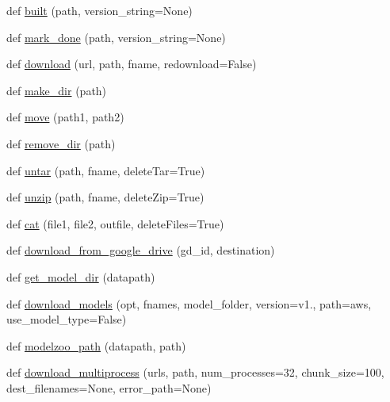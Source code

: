 \begin{DoxyCompactItemize}
\item 
def \hyperlink{namespaceparlai_1_1core_1_1build__data_ad834e1a9be02e18a6c2de2b03b9a8f10}{built} (path, version\+\_\+string=None)
\item 
def \hyperlink{namespaceparlai_1_1core_1_1build__data_a2527e6d29b0ccb7b841182890ac36a59}{mark\+\_\+done} (path, version\+\_\+string=None)
\item 
def \hyperlink{namespaceparlai_1_1core_1_1build__data_ab74f0e428f05e5d91fa93c8afb367622}{download} (url, path, fname, redownload=False)
\item 
def \hyperlink{namespaceparlai_1_1core_1_1build__data_a6ce042fedd4194bd016845bbe7a8facf}{make\+\_\+dir} (path)
\item 
def \hyperlink{namespaceparlai_1_1core_1_1build__data_a1678b8a042eeb9d9c8e9de08f52e496b}{move} (path1, path2)
\item 
def \hyperlink{namespaceparlai_1_1core_1_1build__data_a24ab3b7e68e41adf774df058d330ff33}{remove\+\_\+dir} (path)
\item 
def \hyperlink{namespaceparlai_1_1core_1_1build__data_a4d33f97932682a8513904022d852f3cf}{untar} (path, fname, delete\+Tar=True)
\item 
def \hyperlink{namespaceparlai_1_1core_1_1build__data_a7cbfdf246ca40dc3ed9f8613deb14a00}{unzip} (path, fname, delete\+Zip=True)
\item 
def \hyperlink{namespaceparlai_1_1core_1_1build__data_adc4feba864e2a0d0663cdf6bf84afaf6}{cat} (file1, file2, outfile, delete\+Files=True)
\item 
def \hyperlink{namespaceparlai_1_1core_1_1build__data_ac9224da5c4e4ce9d1f4ab05e837c1f45}{download\+\_\+from\+\_\+google\+\_\+drive} (gd\+\_\+id, destination)
\item 
def \hyperlink{namespaceparlai_1_1core_1_1build__data_ad2fe6222094caae59f304931aee0952a}{get\+\_\+model\+\_\+dir} (datapath)
\item 
def \hyperlink{namespaceparlai_1_1core_1_1build__data_ab697f23f05d3e36d7979fe5e0ed7911e}{download\+\_\+models} (opt, fnames, model\+\_\+folder, version=\textquotesingle{}v1.\textquotesingle{}, path=\textquotesingle{}aws\textquotesingle{}, use\+\_\+model\+\_\+type=False)
\item 
def \hyperlink{namespaceparlai_1_1core_1_1build__data_ad06e9e38ca85db9c4a676ccd9ae41649}{modelzoo\+\_\+path} (datapath, path)
\item 
def \hyperlink{namespaceparlai_1_1core_1_1build__data_ae259aeb321a77560fbcd23028178c897}{download\+\_\+multiprocess} (urls, path, num\+\_\+processes=32, chunk\+\_\+size=100, dest\+\_\+filenames=None, error\+\_\+path=None)
\end{DoxyCompactItemize}


